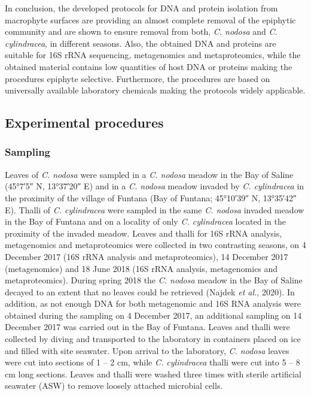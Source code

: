 \documentclass[12pt,]{article}
\begin{document}
In conclusion, the developed protocols for DNA and protein isolation
from macrophyte surfaces are providing an almost complete removal of the
epiphytic community and are shown to ensure removal from both, \emph{C.
nodosa} and \emph{C. cylindracea}, in different seasons. Also, the
obtained DNA and proteins are suitable for 16S rRNA sequencing,
metagenomics and metaproteomics, while the obtained material contains
low quantities of host DNA or proteins making the procedures epiphyte
selective. Furthermore, the procedures are based on universally
available laboratory chemicals making the protocols widely applicable.

\newpage

\hypertarget{experimental-procedures}{%
\subsection{Experimental procedures}\label{experimental-procedures}}

\hypertarget{sampling}{%
\subsubsection{Sampling}\label{sampling}}

Leaves of \emph{C. nodosa} were sampled in a \emph{C. nodosa} meadow in
the Bay of Saline (\ang{45;7;5} N, \ang{13;37;20} E) and in a \emph{C.
nodosa} meadow invaded by \emph{C. cylindracea} in the proximity of the
village of Funtana (Bay of Funtana; \ang{45;10;39} N, \ang{13;35;42} E).
Thalli of \emph{C. cylindracea} were sampled in the same \emph{C.
nodosa} invaded meadow in the Bay of Funtana and on a locality of only
\emph{C. cylindracea} located in the proximity of the invaded meadow.
Leaves and thalli for 16S rRNA analysis, metagenomics and metaproteomics
were collected in two contrasting seasons, on 4 December 2017 (16S rRNA
analysis and metaproteomics), 14 December 2017 (metagenomics) and 18
June 2018 (16S rRNA analysis, metagenomics and metaproteomics). During
spring 2018 the \emph{C. nodosa} meadow in the Bay of Saline decayed to
an extent that no leaves could be retrieved (Najdek \emph{et al.},
2020). In addition, as not enough DNA for both metagenomic and 16S RNA
analysis were obtained during the sampling on 4 December 2017, an
additional sampling on 14 December 2017 was carried out in the Bay of
Funtana. Leaves and thalli were collected by diving and transported to
the laboratory in containers placed on ice and filled with site
seawater. Upon arrival to the laboratory, \emph{C. nodosa} leaves were
cut into sections of 1 -- 2 \si{\cm}, while \emph{C. cylindracea} thalli
were cut into 5 -- 8 \si{\cm} long sections. Leaves and thalli were
washed three times with sterile artificial seawater (ASW) to remove
loosely attached microbial cells.
\end{document}
